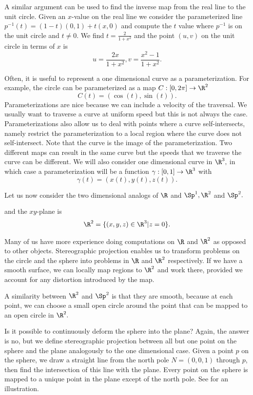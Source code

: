 A similar argument can be used to find the inverse map from
the real line to the unit circle. Given an $x$-value on the real line we consider
the parameterized line $p^{-1}(t)=(1-t)(0,1)+t(x,0)$ and compute
the $t$ value where $p^{-1}$ is on the unit circle and $t\neq 0.$ We find
$t=\frac{2}{1+x^2}$ and the point $(u,v)$ on the unit circle in terms of $x$ is
$$u=\frac{2x}{1+x^2}, v=\frac{x^2-1}{1+x^2}.$$



Often, it is useful to represent a one dimensional curve as a parameterization.
For example, the circle can be parameterized as a map $C:[0,2\pi]\rightarrow \R^2$
$$C(t)=\left(\cos(t),\sin(t)\right).$$ 
Parameterizations are nice because we can include a velocity of the traversal.
We usually want to traverse a curve at uniform speed but this is not always the case.
Parameterizations also allow us to deal with points where a curve self-intersects, namely 
restrict the parameterization to a local region where the curve does not self-intersect.
Note that the curve is the image of the parameterization. Two different maps can result in the same
curve but the speeds that we traverse the curve can be different.
We will also consider one dimensional curve in $\R^3,$ in which case a parameterization
will be a function $\gamma:[0,1]\rightarrow \R^3$ with
$$\gamma(t)=\left(x(t),y(t),z(t)\right).$$



Let us now consider the two dimensional analogs of $\R$ and $\Sp^1, \R^2$ and $\Sp^2.$

and the $xy$-plane is
$$\R^2=\{(x,y,z)\in \R^3 | z=0\}.$$




Many of us have more experience doing computations on $\R$ and $\R^2$ as opposed
to other objects. Stereographic projection enables us to transform problems on
the circle and the sphere into problems in $\R$ and $\R^2$ respectively.
If we have a smooth surface, we can locally map regions to $\R^2$ and work there,
provided we account for any distortion introduced by the map.








A similarity between  $\R^2$ and $\Sp^2$ is that they are smooth, 
because at each point,
we can choose a small open circle around the point that can be mapped
to an open circle in $\R^2.$ 

Is it possible to continuously deform the sphere into the plane?
Again, the answer is no, but we define stereographic projection between all but one point
 on the sphere and the plane analogously to the one dimensional case.
 Given a point $p$ on the sphere, we draw a straight line
from the north pole $N=(0,0,1)$ through $p$, then find the intersection of
this line with the plane. Every point on the sphere is mapped
to a unique point in the plane except of the north pole.
See  for an illustration.





